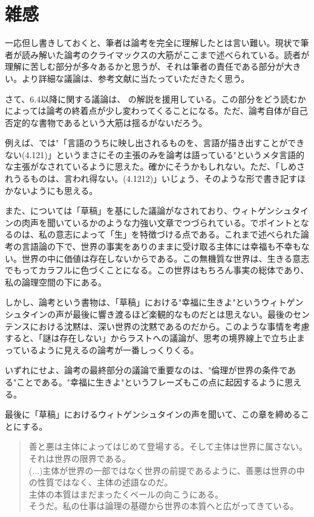 \documentclass[12pt]{jsarticle}
\begin{document}
\section{雑感}
一応但し書きしておくと、筆者は論考を完全に理解したとは言い難い。現状で筆者が読み解いた論考のクライマックスの大筋がここまで述べられている。読者が理解に苦しむ部分が多々あるかと思うが、それは筆者の責任である部分が大きい。より詳細な議論は、参考文献に当たっていただきたく思う。
\par
さて、6.4以降に関する議論は、\cite{光文社} の解説を援用している。この部分をどう読むかによっては論考の終着点が少し変わってくることになる。ただ、論考自体が自己否定的な書物であるという大筋は揺るがないだろう。
\par
例えば、\cite{入門}では"「言語のうちに映し出されるものを、言語が描き出すことができない(4.121)」というまさにその主張のみを論考は語っている"というメタ言語的な主張がなされているように思えた。確かにそうかもしれない。ただ、「しめされうるものは、言われ得ない。(4.1212)」いじょう、そのような形で書き記すほかないようにも思える。
\par
また、\cite{読む, 岩波}については「草稿」を基にした議論がなされており、ウィトゲンシュタインの肉声を聞いているかのような力強い文章でつづられている。\cite{読む, 岩波}でポイントとなるのは、私の意志によって「生」を特徴づける点である。これまで述べられた論考の言語論の下で、世界の事実をありのままに受け取る主体には幸福も不幸もない。世界の中に価値は存在しないからである。この無機質な世界は、生きる意志でもってカラフルに色づくことになる。この世界はもちろん事実の総体であり、私の論理空間の下にある。
\par
しかし、論考という書物は、「草稿」における"幸福に生きよ"というウィトゲンシュタインの声が最後に響き渡るほど楽観的なものだとは思えない。最後のセンテンスにおける沈黙は、深い世界の沈黙であるのだから。このような事情を考慮すると、「謎は存在しない」からラストへの議論が、思考の境界線上で立ち止まっているように見える\cite{光文社}の論考が一番しっくりくる。
\par
いずれにせよ、論考の最終部分の議論で重要なのは、"倫理が世界の条件である"ことである。"幸福に生きよ"というフレーズもこの点に起因するように思える。
\par
最後に「草稿」におけるウィトゲンシュタインの声を聞いて、この章を締めることにする。

\begin{quote}
善と悪は主体によってはじめて登場する。そして主体は世界に属さない。それは世界の限界である。\\
(...)主体が世界の一部ではなく世界の前提であるように、善悪は世界の中の性質ではなく、主体の述語なのだ。\\
主体の本質はまだまったくベールの向こうにある。\\
そうだ。私の仕事は論理の基礎から世界の本質へと広がってきている。
\end{quote}
\end{document}
